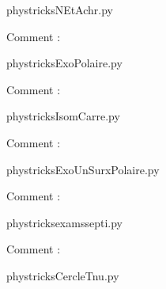     \newcommand{\CaptionFigNEtAchr}{<+Type your caption here+>}
    \begin{center}
        
    \end{center}
    phystricksNEtAchr.py

    Comment : 

    \clearpage
    


    \newcommand{\CaptionFigExoPolaire}{<+Type your caption here+>}
    \begin{center}
        
    \end{center}
    phystricksExoPolaire.py

    Comment : 

    \clearpage
    


    \newcommand{\CaptionFigIsomCarre}{<+Type your caption here+>}
    \begin{center}
        
    \end{center}
    phystricksIsomCarre.py

    Comment : 

    \clearpage
    


    \newcommand{\CaptionFigExoUnSurxPolaire}{<+Type your caption here+>}
    \begin{center}
        
    \end{center}
    phystricksExoUnSurxPolaire.py

    Comment : 

    \clearpage
    


    \newcommand{\CaptionFigexamssepti}{<+Type your caption here+>}
    \begin{center}
        
    \end{center}
    phystricksexamssepti.py

    Comment : 

    \clearpage
    


    \newcommand{\CaptionFigCercleTnu}{<+Type your caption here+>}
    \begin{center}
        
    \end{center}
    phystricksCercleTnu.py

